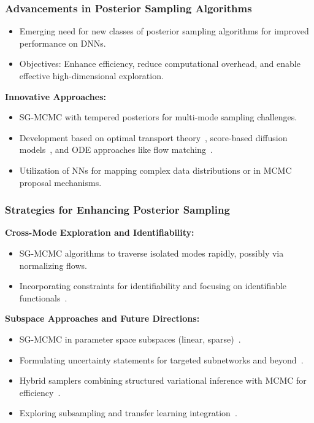 \documentclass[9pt,handout]{beamer}
\begin{document}
\begin{frame}
\frametitle{Advancements in Posterior Sampling Algorithms}

\begin{itemize}
    \item Emerging need for new classes of posterior sampling algorithms for improved performance on DNNs.
    \item Objectives: Enhance efficiency, reduce computational overhead, and enable effective high-dimensional exploration.
\end{itemize}

\textbf{Innovative Approaches:}
\begin{itemize}
    \item SG-MCMC with tempered posteriors for multi-mode sampling challenges.
    \item Development based on optimal transport theory~\citep{villani2021topics}, score-based diffusion models~\citep{song2020score}, and ODE approaches like flow matching~\citep{lipman2022flow}.
    \item Utilization of NNs for mapping complex data distributions or in MCMC proposal mechanisms.
\end{itemize}

\end{frame}

\begin{frame}
\frametitle{Strategies for Enhancing Posterior Sampling}

\textbf{Cross-Mode Exploration and Identifiability:}
\begin{itemize}
    \item SG-MCMC algorithms to traverse isolated modes rapidly, possibly via normalizing flows.
    \item Incorporating constraints for identifiability and focusing on identifiable functionals~\citep{gu2023}.
\end{itemize}

\textbf{Subspace Approaches and Future Directions:}
\begin{itemize}
    \item SG-MCMC in parameter space subspaces (linear, sparse)~\citep{izmailov2020,li2023training}.
    \item Formulating uncertainty statements for targeted subnetworks and beyond~\citep{dold2024}.
    \item Hybrid samplers combining structured variational inference with MCMC for efficiency~\citep{alexos2022structured}.
    \item Exploring subsampling and transfer learning integration~\citep{kirichenko2023last}.
\end{itemize}

\end{frame}
\end{document}
